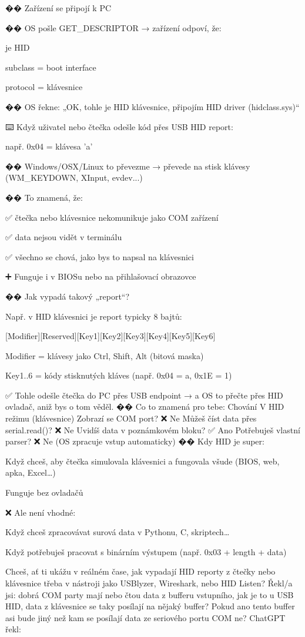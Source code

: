     �� Zařízení se připojí k PC

    �� OS pošle GET_DESCRIPTOR → zařízení odpoví, že:

        je HID

        subclass = boot interface

        protocol = klávesnice

    �� OS řekne: „OK, tohle je HID klávesnice, připojím HID driver (hidclass.sys)“

    ⌨️ Když uživatel nebo čtečka odešle kód přes USB HID report:

        např. 0x04 = klávesa 'a'

    �� Windows/OSX/Linux to převezme → převede na stisk klávesy (WM_KEYDOWN, XInput, evdev...)

�� To znamená, že:

    ✅ čtečka nebo klávesnice nekomunikuje jako COM zařízení

    ✅ data nejsou vidět v terminálu

    ✅ všechno se chová, jako bys to napsal na klávesnici

    ➕ Funguje i v BIOSu nebo na přihlašovací obrazovce

�� Jak vypadá takový „report“?

Např. v HID klávesnici je report typicky 8 bajtů:

[Modifier][Reserved][Key1][Key2][Key3][Key4][Key5][Key6]

    Modifier = klávesy jako Ctrl, Shift, Alt (bitová maska)

    Key1..6 = kódy stisknutých kláves (např. 0x04 = a, 0x1E = 1)

✅ Tohle odešle čtečka do PC přes USB endpoint → a OS to přečte přes HID ovladač, aniž bys o tom věděl.
�� Co to znamená pro tebe:
Chování	V HID režimu (klávesnice)
Zobrazí se COM port?	❌ Ne
Můžeš číst data přes serial.read()?	❌ Ne
Uvidíš data v poznámkovém bloku?	✅ Ano
Potřebuješ vlastní parser?	❌ Ne (OS zpracuje vstup automaticky)
�� Kdy HID je super:

    Když chceš, aby čtečka simulovala klávesnici a fungovala všude (BIOS, web, apka, Excel…)

    Funguje bez ovladačů

❌ Ale není vhodné:

    Když chceš zpracovávat surová data v Pythonu, C, skriptech…

    Když potřebuješ pracovat s binárním výstupem (např. 0x03 + length + data)

Chceš, ať ti ukážu v reálném čase, jak vypadají HID reporty z čtečky nebo klávesnice třeba v nástroji jako USBlyzer, Wireshark, nebo HID Listen?
Řekl/a jsi:
dobrá COM party mají nebo čtou data z bufferu vstupního, jak je to u USB HID, data z klávesnice se taky posílají na nějaký buffer? Pokud ano tento buffer asi bude jiný než kam se posílají data ze seriového portu COM ne?
ChatGPT řekl:

